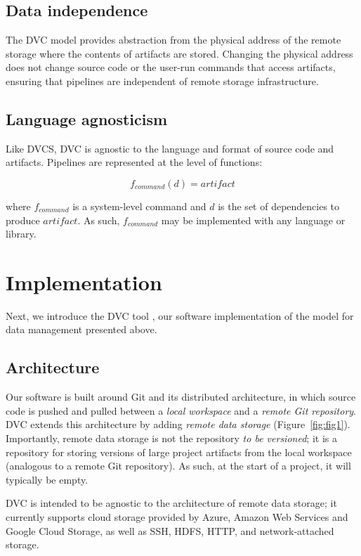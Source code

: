 \documentclass[10pt,sigconf, authordraft]{acmart}
\begin{document}
\subsection{Data independence}
The DVC model provides abstraction from the physical address of the remote storage where the contents of artifacts are stored. Changing the physical address does not change source code or the user-run commands that access artifacts, ensuring that pipelines are independent of remote storage infrastructure.

\subsection{Language agnosticism}
Like DVCS, DVC is agnostic to the language and format of source code and artifacts. Pipelines are represented at the level of functions:

\begin{equation}
    f_{command}(d) = artifact
\end{equation}

where $f_{command}$ is a system-level command and $d$ is the set of dependencies to produce $artifact$. As such, $f_{command}$ may be implemented with any language or library.  





\section{Implementation}
Next, we introduce the DVC tool \cite{ruslan_kuprieiev_2020_3690237}, our software implementation of the model for data management presented above. 

\subsection{Architecture}
Our software is built around Git and its distributed architecture, in which source code is pushed and pulled between a \textit{local workspace} and a \textit{remote Git repository}. DVC extends this architecture by adding \textit{remote data storage} (Figure~\ref{fig:fig1}). Importantly, remote data storage is not the repository \textit{to be versioned}; it is a repository for storing versions of large project artifacts from the local workspace (analogous to a remote Git repository). As such, at the start of a project, it will typically be empty. 

DVC is intended to be agnostic to the architecture of remote data storage; it currently supports cloud storage provided by Azure, Amazon Web Services and Google Cloud Storage, as well as SSH, HDFS, HTTP, and network-attached storage.  
\end{document}
